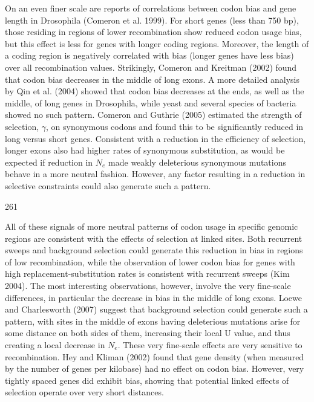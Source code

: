 \documentclass{article}
\begin{document}
On an even finer scale are reports of correlations between codon bias and gene length in Drosophila (Comeron et al. 1999). For short genes (less than 750 bp), those residing in regions of lower recombination show reduced codon usage bias, but this effect is less for genes with longer coding regions. Moreover, the length of a coding region is negatively correlated with bias (longer genes have less bias) over all recombination values. Strikingly, Comeron and Kreitman (2002) found that codon bias decreases in the middle of long exons. A more detailed analysis by Qin et al. (2004) showed that codon bias decreases at the ends, as well as the middle, of long genes in Drosophila, while yeast and several species of bacteria showed no such pattern. Comeron and Guthrie (2005) estimated the strength of selection,  $ \gamma $, on synonymous codons and found this to be significantly reduced in long versus short genes. Consistent with a reduction in the efficiency of selection, longer exons also had higher rates of synonymous substitution, as would be expected if reduction in  $ N_{e} $ made weakly deleterious synonymous mutations behave in a more neutral fashion. However, any factor resulting in a reduction in selective constraints could also generate such a pattern.

261

All of these signals of more neutral patterns of codon usage in specific genomic regions are consistent with the effects of selection at linked sites. Both recurrent sweeps and background selection could generate this reduction in bias in regions of low recombination, while the observation of lower codon bias for genes with high replacement-substitution rates is consistent with recurrent sweeps (Kim 2004). The most interesting observations, however, involve the very fine-scale differences, in particular the decrease in bias in the middle of long exons. Loewe and Charlesworth (2007) suggest that background selection could generate such a pattern, with sites in the middle of exons having deleterious mutations arise for some distance on both sides of them, increasing their local U value, and thus creating a local decrease in  $ N_{e} $. These very fine-scale effects are very sensitive to recombination. Hey and Kliman (2002) found that gene density (when measured by the number of genes per kilobase) had no effect on codon bias. However, very tightly spaced genes did exhibit bias, showing that potential linked effects of selection operate over very short distances.
\end{document}
